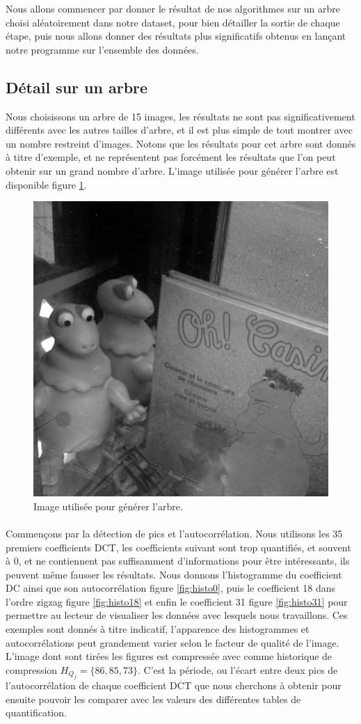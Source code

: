 \documentclass[utf8,final]{stageM2R} %
\begin{document}
Nous allons commencer par donner le résultat de nos algorithmes sur un arbre choisi aléatoirement dans notre dataset, pour bien détailler la sortie de chaque étape, puis nous allons donner des résultats plus significatifs obtenus en lançant notre programme sur l'ensemble des données.

\subsection{Détail sur un arbre}
Nous choisissons un arbre de 15 images, les résultats ne sont pas significativement différents avec les autres tailles d'arbre, et il est plus simple de tout montrer avec un nombre restreint d'images. Notons que les résultats pour cet arbre sont donnés à titre d'exemple, et ne représentent pas forcément les résultats que l'on peut obtenir sur un grand nombre d'arbre. L'image utilisée pour générer l'arbre est disponible figure \ref{casimir}.

\begin{figure}[H]
\centering
\includegraphics[width=0.5\linewidth]{images/casimir}
\caption{Image utilisée pour générer l'arbre.}
\label{casimir}
\end{figure}

\paragraph{}
Commençons par la détection de pics et l'autocorrélation. Nous utilisons les 35 premiers coefficients DCT, les coefficients suivant sont trop quantifiés, et souvent à 0, et ne contiennent pas suffisamment d'informations pour être intéressants, ils peuvent même fausser les résultats. Nous donnons l'histogramme du coefficient DC ainsi que son autocorrélation figure \ref{fig:histo0}, puis le coefficient 18 dans l'ordre zigzag figure \ref{fig:histo18} et enfin le coefficient 31 figure \ref{fig:histo31} pour permettre au lecteur de visualiser les données avec lesquels nous travaillons. Ces exemples sont donnés à titre indicatif, l'apparence des histogrammes et autocorrélations peut grandement varier selon le facteur de qualité de l'image. L'image dont sont tirées les figures est compressée avec comme historique de compression $H_{Q_{f}} = \{86, 85, 73\}$. C'est la période, ou l'écart entre deux pics de l'autocorrélation de chaque coefficient DCT que nous cherchons à obtenir pour ensuite pouvoir les comparer avec les valeurs des différentes tables de quantification.
\end{document}
